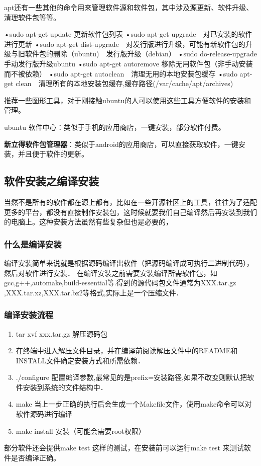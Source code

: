  apt还有一些其他的命令用来管理软件源和软件包，其中涉及源更新、软件升级、清理软件包等等。
  \begin{Code}
 •sudo apt-get update 更新软件包列表
 •sudo apt-get upgrade　对已安装的软件进行更新
 •sudo apt-get dist-upgrade　对发行版进行升级，可能有新软件包的升级与旧软件包的删除（ubuntu)　发行版升级（debian）
 •sudo do-release-upgrade　手动发行版升级ubuntu
 •sudo apt-get autoremove 移除无用软件包（非手动安装而不被依赖）
 •sudo apt-get autoclean　清理无用的本地安装包缓存
 •sudo apt-get clean　清理所有的本地安装包缓存,缓存路径(/var/cache/apt/archives)
  \end{Code}

 推荐一些图形工具，对于刚接触ubuntu的人可以使用这些工具方便软件的安装和管理。
 
 ubuntu 软件中心：类似于手机的应用商店，一键安装，部分软件付费。
 
 \textbf{新立得软件包管理器}：类似于android的应用商店，可以直接获取软件，一键安装，并且便于软件的更新。
\subsection{软件安装之编译安装}
 当然不是所有的软件都在源上都有，比如在一些开源社区上的工具，往往为了适配更多的平台，都没有直接制作安装包，这时候就要我们自己编译然后再安装到我们的电脑上。这种安装方法虽然有些复杂但也是必要的，
 
\subsubsection{什么是编译安装}
 编译安装简单来说就是根据源码编译出软件（把源码编译成可执行二进制代码），然后对软件进行安装．
 在编译安装之前需要安装编译所需软件包，如gcc,g++,automake,build-essential等.得到的源代码包文件通常为XXX.tar.gz ,XXX.tar.xz,XXX.tar.bz2等格式,实际上是一个压缩文件．
\subsubsection{编译安装流程}
\begin{enumerate}
	\item  tar xvf xxx.tar.gz 解压源码包  
	\item 在终端中进入解压文件目录，并在编译前阅读解压文件中的README和INSTALL文件确定安装方式和所需依赖．
	\item  ./configure  配置编译参数,最常见的是prefix=安装路径,如果不改变则默认把软件安装到系统的文件结构中．
	\item  make 当上一步正确的执行后会生成一个Makefile文件，使用make命令可以对软件源码进行编译
	\item  make install 安装（可能会需要root权限）
\end{enumerate}
 部分软件还会提供make test 这样的测试，在安装前可以运行make test 来测试软件是否编译正确。

